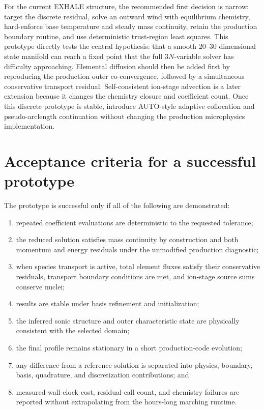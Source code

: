 \documentclass[english,a4paper]{my_memo}
\begin{document}
For the current EXHALE structure, the recommended first decision is narrow:
target the discrete residual, solve an outward wind with equilibrium chemistry,
hard-enforce base temperature and steady mass continuity, retain the production
boundary routine, and use deterministic trust-region least squares.  This
prototype directly tests the central hypothesis: that a smooth 20--30 dimensional
state manifold can reach a fixed point that the full \(3N\)-variable solver has
difficulty approaching.  Elemental diffusion should then be added first by
reproducing the production outer co-convergence, followed by a simultaneous
conservative transport residual.  Self-consistent ion-stage advection is a
later extension because it changes the chemistry closure and coefficient count.
Once this discrete prototype is stable, introduce AUTO-style adaptive
collocation and pseudo-arclength continuation without changing the production
microphysics implementation.

\section{Acceptance criteria for a successful prototype}\label{sec:acceptance}

The prototype is successful only if all of the following are demonstrated:
\begin{enumerate}
\item repeated coefficient evaluations are deterministic to the requested
  tolerance;
\item the reduced solution satisfies mass continuity by construction and both
  momentum and energy residuals under the unmodified production diagnostic;
\item when species transport is active, total element fluxes satisfy their
  conservative residuals, transport boundary conditions are met, and ion-stage
  source sums conserve nuclei;
\item results are stable under basis refinement and initialization;
\item the inferred sonic structure and outer characteristic state are physically
  consistent with the selected domain;
\item the final profile remains stationary in a short production-code evolution;
\item any difference from a reference solution is separated into physics,
  boundary, basis, quadrature, and discretization contributions; and
\item measured wall-clock cost, residual-call count, and chemistry failures are
  reported without extrapolating from the hours-long marching runtime.
\end{enumerate}
\end{document}
